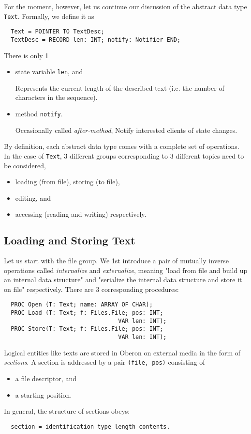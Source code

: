 For the moment, however, let us continue our discussion of the abstract data type \verb|Text|.
Formally, we define it as
\begin{verbatim}
  Text = POINTER TO TextDesc;
  TextDesc = RECORD len: INT; notify: Notifier END;
\end{verbatim}
There is only 1
\begin{itemize}
  \item state variable \verb|len|, and

    Represents the current length of the described text
    (i.e. the number of characters in the sequence).
  \item method \verb|notify|.

    Occasionally called \emph{after-method},
    Notify interested clients of state changes.
\end{itemize}

By definition, each abstract data type comes with a complete set of operations.
In the case of \verb|Text|, 3 different groups corresponding to 3 different topics
need to be considered,
\begin{itemize}
  \item loading (from file),
        storing (to file),
  \item editing, and
  \item accessing (reading and writing) respectively.
\end{itemize}

\subsection{Loading and Storing Text}
Let us start with the file group. We 1st introduce a pair of mutually inverse operations
called \emph{internalize} and \emph{externalize},
meaning "load from file and build up an internal data structure"
and "serialize the internal data structure and store it on file" respectively.
There are 3 corresponding procedures:
\begin{verbatim}
  PROC Open (T: Text; name: ARRAY OF CHAR);
  PROC Load (T: Text; f: Files.File; pos: INT;
                                 VAR len: INT);
  PROC Store(T: Text; f: Files.File; pos: INT;
                                 VAR len: INT);
\end{verbatim}
Logical entities like texts are stored in Oberon on external media in the form of \emph{sections}.
A section is addressed by a pair \verb|(file, pos)| consisting of
\begin{itemize}
  \item a file descriptor, and
  \item a starting position.
\end{itemize}
In general, the structure of sections obeys:
\begin{verbatim}
  section = identification type length contents.
\end{verbatim}

